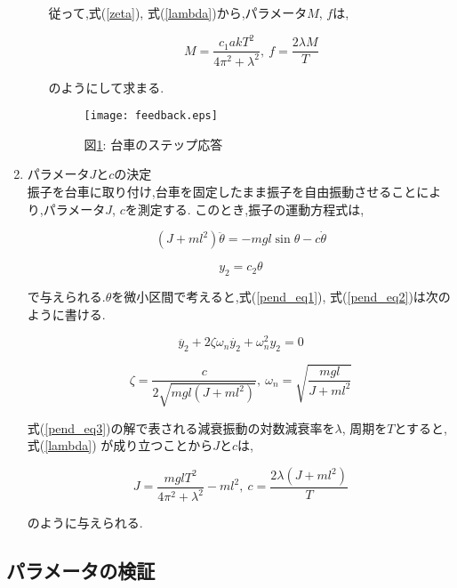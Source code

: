 \begin{enumerate}
\begin{itemize}
        従って,式(\ref{zeta}), 式(\ref{lambda})から,パラメータ$M$, $f$は,

        \begin{equation}
            M = \frac{c_{1}akT^2}{4\pi^2 + \lambda^2},\
            f = \frac{2\lambda M}{T}
        \end{equation}

        のようにして求まる.

        \begin{figure}[htbp]
            \begin{center}
                \texttt{[image: feedback.eps]}
                \caption{図\ref{feedback}: 台車のステップ応答}
                \label{feedback}
            \end{center}
        \end{figure}

    \end{itemize}

    \item パラメータ$J$と$c$の決定 \\
    \quad 振子を台車に取り付け,台車を固定したまま振子を自由振動させることにより,パラメータ$J$, $c$を測定する.
    このとき,振子の運動方程式は,

    \begin{equation}
        (J + ml^2) \ddot{\theta} = -mgl\sin{\theta} - c \dot{\theta}
        \label{pend_eq1}
    \end{equation}

    \begin{equation}
        y_{2} = c_{2} \theta
        \label{pend_eq2}
    \end{equation}

    で与えられる.$\theta$を微小区間で考えると,式(\ref{pend_eq1}), 式(\ref{pend_eq2})は次のように書ける.

    \begin{equation}
        \ddot{y_2} + 2\zeta \omega_{n} \dot{y_{2}} + \omega_{n}^2y_{2} = 0
        \label{pend_eq3}
    \end{equation}

    \begin{equation}
        \zeta = \frac{c}{2\sqrt{mgl(J + ml^2)}},\
        \omega_{n} = \sqrt{\frac{mgl}{J + ml^2}}
    \end{equation}

    式(\ref{pend_eq3})の解で表される減衰振動の対数減衰率を$\lambda$, 周期を$T$とすると,式(\ref{lambda})
    が成り立つことから$J$と$c$は,

    \begin{equation}
        J = \frac{mglT^2}{4\pi^2 + \lambda^2} - ml^2,\
        c = \frac{2\lambda (J + ml^2)}{T}
    \end{equation}

    のように与えられる.

\end{enumerate}


\subsection{パラメータの検証}

